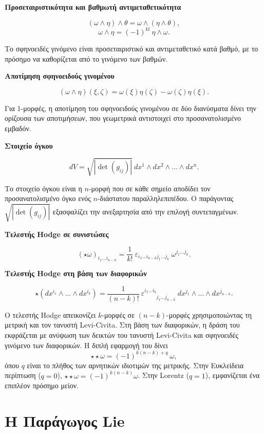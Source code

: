\documentclass[12pt]{article}
\begin{document}
\textbf{Προσεταιριστικότητα και βαθμωτή αντιμεταθετικότητα}

\[
(\omega \wedge \eta) \wedge \theta = \omega \wedge (\eta \wedge \theta), \tag{50}
\]
\[
\omega \wedge \eta = (-1)^{kl} \ \eta \wedge \omega. \tag{51}
\]

Το σφηνοειδές γινόμενο είναι προσεταιριστικό και αντιμεταθετικό κατά βαθμό, με το πρόσημο να καθορίζεται από το γινόμενο των βαθμών.

\textbf{Αποτίμηση σφηνοειδούς γινομένου}

\[
(\omega \wedge \eta)(\xi, \zeta) = \omega(\xi) \eta(\zeta) - \omega(\zeta) \eta(\xi). \tag{47}
\]

Για 1-μορφές, η αποτίμηση του σφηνοειδούς γινομένου σε δύο διανύσματα δίνει την ορίζουσα των αποτιμήσεων, που γεωμετρικά αντιστοιχεί στο προσανατολισμένο εμβαδόν.

\textbf{Στοιχείο όγκου}

\[
dV = \sqrt{|\det(g_{ij})|} \ dx^1 \wedge dx^2 \wedge \dots \wedge dx^n. \tag{43}
\]

Το στοιχείο όγκου είναι η \( n \)-μορφή που σε κάθε σημείο αποδίδει τον προσανατολισμένο όγκο ενός \( n \)-διάστατου παραλληλεπιπέδου. Ο παράγοντας \( \sqrt{|\det(g_{ij})|} \) εξασφαλίζει την ανεξαρτησία από την επιλογή συντεταγμένων.

\textbf{Τελεστής Hodge σε συνιστώσες}

\[
(\star \omega)_{i_1 \dots i_{n-k}} = \frac{1}{k!} \ \varepsilon_{i_1 \dots i_{n-k} j_1 \dots j_k} \ \omega^{j_1 \dots j_k}. \tag{44}
\]

\textbf{Τελεστής Hodge στη βάση των διαφορικών}

\[
\star (dx^{i_1} \wedge \dots \wedge dx^{i_k}) = \frac{1}{(n-k)!} \ \varepsilon^{i_1 \dots i_k}_{\phantom{i_1 \dots i_k} j_1 \dots j_{n-k}} \ dx^{j_1} \wedge \dots \wedge dx^{j_{n-k}}. \tag{45}
\]

Ο τελεστής Hodge απεικονίζει \( k \)-μορφές σε \( (n-k) \)-μορφές χρησιμοποιώντας τη μετρική και τον τανυστή Levi-Civita. Στη βάση των διαφορικών, η δράση του εκφράζεται με ανύψωση των δεικτών του τανυστή Levi-Civita και σφηνοειδές γινόμενο των διαφορικών. Η διπλή εφαρμογή του δίνει
\[
\star \star \omega = (-1)^{k(n-k) + q} \ \omega, \tag{46}
\]
όπου \( q \) είναι το πλήθος των αρνητικών ιδιοτιμών της μετρικής. Στην Ευκλείδεια περίπτωση (\( q=0 \)), \( \star \star \omega = (-1)^{k(n-k)} \omega \). Στην Lorentz (\( q=1 \)), εμφανίζεται ένα επιπλέον πρόσημο μείον.

\section{H Παράγωγος Lie}
\end{document}
